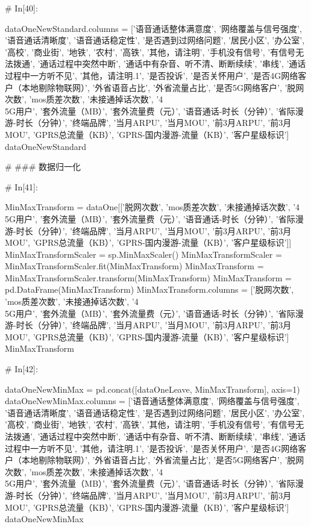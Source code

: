 \documentclass{MathorCupmodeling}
\begin{document}
\begin{python}
	# In[40]:
	
	
	dataOneNewStandard.columns = ['语音通话整体满意度', '网络覆盖与信号强度', '语音通话清晰度', '语音通话稳定性', '是否遇到过网络问题', '居民小区', '办公室', '高校', '商业街', '地铁', '农村', '高铁', '其他，请注明', '手机没有信号', '有信号无法拨通', '通话过程中突然中断', '通话中有杂音、听不清、断断续续', '串线', '通话过程中一方听不见', '其他，请注明.1', '是否投诉', '是否关怀用户', '是否4G网络客户（本地剔除物联网）', '外省语音占比', '外省流量占比', '是否5G网络客户', '脱网次数', 'mos质差次数', '未接通掉话次数', '4\\5G用户', '套外流量（MB）', '套外流量费（元）', '语音通话-时长（分钟）', '省际漫游-时长（分钟）', '终端品牌', '当月ARPU', '当月MOU', '前3月ARPU', '前3月MOU', 'GPRS总流量（KB）', 'GPRS-国内漫游-流量（KB）', '客户星级标识']
	dataOneNewStandard
	
	# ### 数据归一化
	
	# In[41]:
	
	
	MinMaxTransform = dataOne[['脱网次数', 'mos质差次数', '未接通掉话次数', '4\\5G用户', '套外流量（MB）', '套外流量费（元）', '语音通话-时长（分钟）', '省际漫游-时长（分钟）', '终端品牌', '当月ARPU', '当月MOU', '前3月ARPU', '前3月MOU', 'GPRS总流量（KB）', 'GPRS-国内漫游-流量（KB）', '客户星级标识']]
	MinMaxTransformScaler = sp.MinMaxScaler()
	MinMaxTransformScaler = MinMaxTransformScaler.fit(MinMaxTransform)
	MinMaxTransform = MinMaxTransformScaler.transform(MinMaxTransform)
	MinMaxTransform = pd.DataFrame(MinMaxTransform)
	MinMaxTransform.columns = ['脱网次数', 'mos质差次数', '未接通掉话次数', '4\\5G用户', '套外流量（MB）', '套外流量费（元）', '语音通话-时长（分钟）', '省际漫游-时长（分钟）', '终端品牌', '当月ARPU', '当月MOU', '前3月ARPU', '前3月MOU', 'GPRS总流量（KB）', 'GPRS-国内漫游-流量（KB）', '客户星级标识']
	MinMaxTransform
	
	# In[42]:
	
	
	dataOneNewMinMax = pd.concat([dataOneLeave, MinMaxTransform], axis=1)
	dataOneNewMinMax.columns = ['语音通话整体满意度', '网络覆盖与信号强度', '语音通话清晰度', '语音通话稳定性', '是否遇到过网络问题', '居民小区', '办公室', '高校', '商业街', '地铁', '农村', '高铁', '其他，请注明', '手机没有信号', '有信号无法拨通', '通话过程中突然中断', '通话中有杂音、听不清、断断续续', '串线', '通话过程中一方听不见', '其他，请注明.1', '是否投诉', '是否关怀用户', '是否4G网络客户（本地剔除物联网）', '外省语音占比', '外省流量占比', '是否5G网络客户', '脱网次数', 'mos质差次数', '未接通掉话次数', '4\\5G用户', '套外流量（MB）', '套外流量费（元）', '语音通话-时长（分钟）', '省际漫游-时长（分钟）', '终端品牌', '当月ARPU', '当月MOU', '前3月ARPU', '前3月MOU', 'GPRS总流量（KB）', 'GPRS-国内漫游-流量（KB）', '客户星级标识']
	dataOneNewMinMax
	

\end{python}
\end{document}
